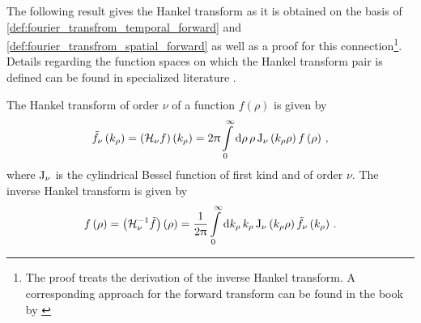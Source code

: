 The following result gives the Hankel transform as it is obtained on the
basis of \cref{def:fourier_transfrom_temporal_forward} and
\cref{def:fourier_transfrom_spatial_forward} as well as a proof for this
connection\footnote{The proof treats the derivation of the inverse Hankel
transform. A corresponding approach for the forward transform can be found
in the book by \textcite[p229]{Davies2002}}.
Details regarding the function spaces on which the Hankel transform pair is
defined can be found in specialized literature \cite{Patra2018,Davies2002}.

\begin{corollary}
	\label{coll:hankel_transform}
	The Hankel transform of order $\nu$ of a function $f\left(\rho\right)$ is
	given by
	\begin{equation}\label{eq:hankel_transform}
		\tilde{f}_\nu \left(k_\rho\right) =
		\left( \mathcal{H}_{\nu} f \right) \left(k_\rho\right) = 
		2\uppi
		\int\limits_{0}^{\infty} \mathrm{d} \rho \, \rho
		\operatorname{J}_{\nu}\left(k_\rho \rho\right)
		f\left(\rho\right) \, ,
	\end{equation}
	where $\operatorname{J}_{\nu}$ is the cylindrical Bessel function of first kind and
	of order $\nu$.
	The inverse Hankel transform is given by
	\begin{equation}\label{eq:hankel_transform_inverse}
		f\left(\rho\right) =
		\left( \mathcal{H}^{-1}_{\nu}\tilde{f}\right) \left(\rho\right) =
		\frac{1}{2\uppi}
		\int\limits_{0}^{\infty} \mathrm{d} k_\rho \, k_\rho
		\operatorname{J}_{\nu}\left(k_\rho \rho\right)
		\tilde{f}_\nu\left(k_\rho\right) \, .
	\end{equation}
\end{corollary}
